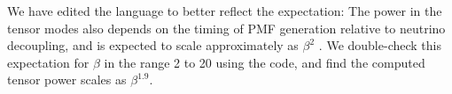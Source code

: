\documentclass{article}
\newcommand{\diff}[1]{\textcolor{PineGreen}{#1}}
\begin{document}
We have edited the language to better reflect the expectation:
\diff{The power in the tensor modes also depends on the timing of PMF generation relative to neutrino decoupling, and is expected to scale approximately as $\beta^2$ \citep{lewis04,shaw10b}.   
We double-check this expectation for $\beta$ in the range 2 to 20 using the  \citet{zucca16} code, and find the computed tensor power scales as $\beta^{1.9}$. }
\end{document}
